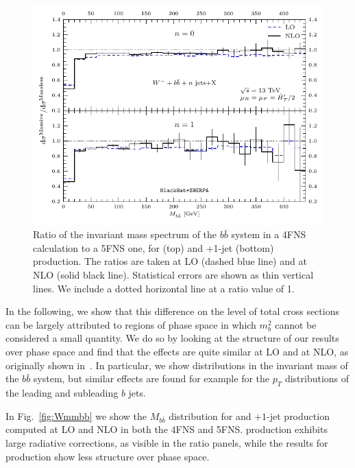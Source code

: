 
\begin{figure}[]
\centering
\includegraphics[clip,scale=1.02]{plots/crmbb}
  \caption{Ratio of the invariant mass spectrum of the $b\bar b$
    system in a 4FNS calculation to a 5FNS one, for \Wbbm{} (top) and \Wbbm+1-jet (bottom) production. The ratios are taken at LO (dashed blue line) and at NLO (solid black line).
    Statistical errors are shown as thin vertical lines. We include a dotted
    horizontal line at a ratio value of 1.}
  \label{fig:ratWmmbb}
\end{figure}

In the following, we show that this difference on the level of total cross sections can be largely attributed to regions of phase space in which
$m_b^2$ cannot be considered a small quantity. We do so by looking at the
structure of our results over phase space and find that the effects are
quite similar at LO and at NLO, as originally shown
in~\cite{FebresCordero:2006sj}. In particular, we show distributions in the invariant
mass of the $b\bar b$ system, but similar effects are found for
example for the $p_T$ distributions of the leading and subleading $b$ jets.

In Fig.~\ref{fig:Wmmbb} we show the $M_{b\bar b}$ distribution for \Wbbm{} and
\Wbbm$+1$-jet production computed at LO and NLO in both the 4FNS and
5FNS. \Wbb{} production exhibits large radiative corrections, as
visible in the ratio panels, while the
results for \Wbbnj[1]{} production show less structure over phase space. 


